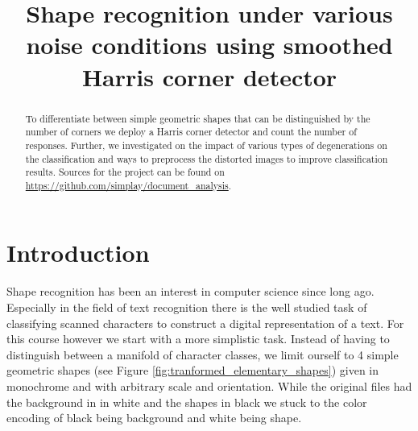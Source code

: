 \documentclass[conference]{IEEEtran}
\begin{document}
%
\title{Shape recognition under various noise conditions using smoothed Harris corner detector}

\author{
\and
{}
}

\maketitle

\begin{abstract}
To differentiate between simple geometric shapes that can be distinguished by the number
of corners we deploy a Harris corner detector\cite{Harris88acombined} and count
the number of responses. Further, we 
investigated on the impact of various types of degenerations on the classification and ways
to preprocess the distorted images to improve classification results. 
Sources for the project can be found on \url{https://github.com/simplay/document_analysis}.

\end{abstract}

\section{Introduction}
Shape recognition has been an interest in computer science since long ago. Especially in the
field of text recognition there is the well studied task of classifying scanned characters 
to construct a digital representation of a text. 
For this course however we start with a more simplistic task. Instead of having to
distinguish between a manifold of character classes, we limit ourself to 
4 simple geometric shapes (see Figure \ref{fig:tranformed_elementary_shapes}) given in monochrome and with arbitrary scale and orientation. While the original files had the 
background in in white and the shapes in black we stuck to the color encoding of black being
background and white being shape.
\end{document}
